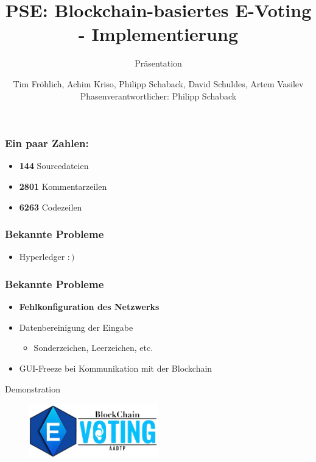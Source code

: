 \documentclass{beamer}
\title[]{PSE: Blockchain-basiertes E-Voting - Implementierung}
\subtitle{Präsentation}
\author{Tim Fröhlich, Achim Kriso, Philipp Schaback, David Schuldes, Artem Vasilev\\ Phasenverantwortlicher: Philipp Schaback}
\institute[]{KARLSRUHER INSTITUT FÜR TECHNOLOGIE (KIT)}
\begin{document}
\begin{frame}

\maketitle

\end{frame}

\begin{frame}
\frametitle{Ein paar Zahlen:}
\begin{itemize}
	\item \textbf{144} Sourcedateien
	\item \textbf{2801} Kommentarzeilen
	\item \textbf{6263} Codezeilen
\end{itemize}
\end{frame}

\begin{frame}
	\frametitle{Bekannte Probleme}
		\begin{itemize}
			\item Hyperledger $:)$
		\end{itemize}
\end{frame}	
\begin{frame}
	\frametitle{Bekannte Probleme}
	\begin{itemize}
		\item \textbf{Fehlkonfiguration des Netzwerks}
		\item Datenbereinigung der Eingabe
		\begin{itemize}
			\item Sonderzeichen, Leerzeichen, etc.
		\end{itemize}
		\item GUI-Freeze bei Kommunikation mit der Blockchain
		
	\end{itemize}
\end{frame}

\begin{frame}
\begin{center}
	\huge Demonstration
	\begin{figure}[h!]
		\includegraphics[width=0.5\textwidth]{pictures/logo}
	\end{figure}
\end{center}
\end{frame}
\end{document}

